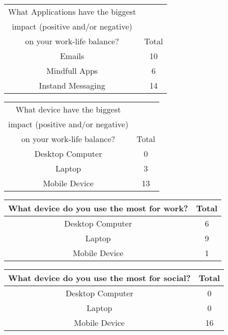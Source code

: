\documentclass{sigchi}
\begin{document}
	\begin{center}
		\begin{tabular}{ |c| c | }
			\hline
			What Applications have the biggest & \\
			 impact (positive and/or negative) & \\
			  on your work-life balance?  & Total  \\ 
			\hline
			Emails & 10 \\ 
			\hline
			Mindfull Apps & 6  \\ 
			\hline
			Instand Messaging &  14 \\
			\hline
			
		\end{tabular}
	\end{center}
	
	\begin{center}
		\begin{tabular}{ |c| c | }
			\hline
			What device have the biggest & \\
			impact (positive and/or negative) & \\
			on your work-life balance?  & Total  \\ 
			\hline
			Desktop Computer & 0 \\ 
			\hline
			Laptop & 3  \\ 
			\hline
			Mobile Device &  13 \\
			\hline
			
		\end{tabular}
	\end{center}

	\begin{center}
		\begin{tabular}{ |c| c | }
			\hline
			What device do you use the most for work? & Total  \\ 
			\hline
			Desktop Computer & 6 \\ 
			\hline
			Laptop & 9  \\ 
			\hline
			Mobile Device &  1 \\
			\hline
			
		\end{tabular}
	\label{Long table caption}
	\end{center}

\begin{center}
	\begin{tabular}{ |c| c | }
		\hline
		What device do you use the most for social? & Total  \\ 
		\hline
		Desktop Computer & 0 \\ 
		\hline
		Laptop & 0  \\ 
		\hline
		Mobile Device &  16 \\
		\hline
		
	\end{tabular}
\end{center}
\end{document}
